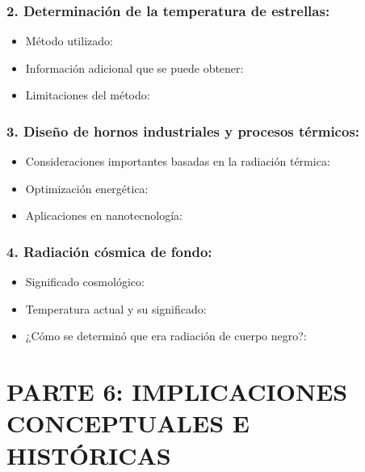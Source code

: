 \documentclass[12pt,a4paper]{article}
\begin{document}
	\subsubsection{2. Determinación de la temperatura de estrellas:}
	\begin{itemize}
		\item Método utilizado: \hrulefill
		\item Información adicional que se puede obtener: \hrulefill
		\item Limitaciones del método: \hrulefill
	\end{itemize}
	
	\subsubsection{3. Diseño de hornos industriales y procesos térmicos:}
	\begin{itemize}
		\item Consideraciones importantes basadas en la radiación térmica: \hrulefill
		\item Optimización energética: \hrulefill
		\item Aplicaciones en nanotecnología: \hrulefill
	\end{itemize}
	
	\subsubsection{4. Radiación cósmica de fondo:}
	\begin{itemize}
		\item Significado cosmológico: \hrulefill
		\item Temperatura actual y su significado: \hrulefill
		\item ¿Cómo se determinó que era radiación de cuerpo negro?: \hrulefill
	\end{itemize}
	
	\section{PARTE 6: IMPLICACIONES CONCEPTUALES E HISTÓRICAS}
	
\end{document}
